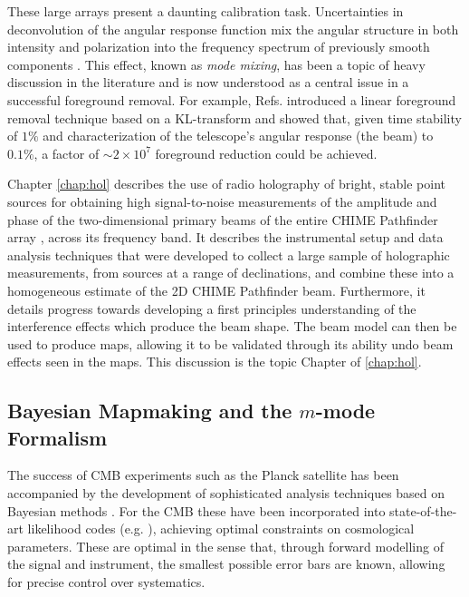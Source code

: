 These large arrays present a daunting calibration task. Uncertainties in deconvolution of the angular response function mix the angular structure in both intensity and polarization into the frequency spectrum of previously smooth components \citep{wedge1}. This effect, known as \textit{mode mixing}, has been a topic of heavy discussion in the literature and is now understood as a central issue in a successful foreground removal. For example, Refs. \citep{mmodes1, mmodes2} introduced a linear foreground removal technique based on a KL-transform and showed that, given time stability of $1\%$ and characterization of the telescope's angular response (the beam) to $0.1\%$, a factor of $\sim2\times 10^7$ foreground reduction could be achieved. 

Chapter \ref{chap:hol} describes the use of radio holography of bright, stable point sources for obtaining high signal-to-noise measurements of the amplitude and phase of the two-dimensional primary beams of the entire CHIME Pathfinder array \citep{chimepath1}, across its frequency band. It describes the instrumental setup and data analysis techniques that were developed to collect a large sample of holographic measurements, from sources at a range of declinations, and combine these into a homogeneous estimate of the 2D CHIME Pathfinder beam. Furthermore, it details progress towards developing a first principles understanding of the interference effects which produce the beam shape. The beam model can then be used to produce maps, allowing it to be validated through its ability undo beam effects seen in the maps. This discussion is the topic Chapter of \ref{chap:hol}.

\subsection{\label{sec:bg:subsec:mmodes} Bayesian Mapmaking and the $m$-mode Formalism}

The success of CMB experiments such as the Planck satellite has been accompanied by the development of sophisticated analysis techniques based on Bayesian methods \citep{bondjaffeknox}. For the CMB these have been incorporated into state-of-the-art likelihood codes (e.g. \citep{commander}), achieving optimal constraints on cosmological parameters. These are optimal in the sense that, through forward modelling of the signal and instrument, the smallest possible error bars are known, allowing for precise control over systematics.


